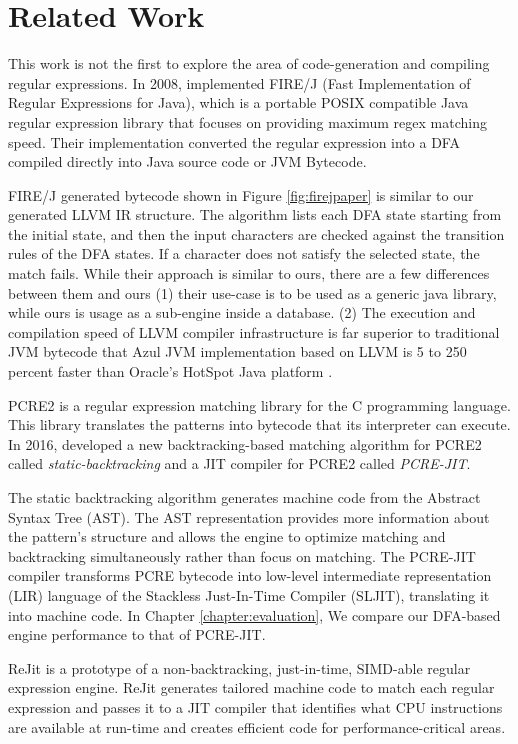 \chapter{Related Work}\label{chapter:related_work}
This work is not the first to explore the area of code-generation and compiling regular expressions. In 2008, \citet{firejpaper} implemented FIRE/J (Fast Implementation of Regular Expressions for Java), which is a portable POSIX compatible Java regular expression library that focuses on providing maximum regex matching speed. Their implementation converted the regular expression into a DFA compiled directly into Java source code or JVM Bytecode.

\noindent FIRE/J generated bytecode shown in Figure \ref{fig:firejpaper} is similar to our generated LLVM IR structure. The algorithm lists each DFA state starting from the initial state, and then the input characters are checked against the transition rules of the DFA states. If a character does not satisfy the selected state, the match fails. While their approach is similar to ours, there are a few differences between them and ours (1) their use-case is to be used as a generic java library, while ours is usage as a sub-engine inside a database. (2) The execution and compilation speed of LLVM compiler infrastructure is far superior to traditional JVM bytecode that Azul JVM implementation based on LLVM is 5 to 250 percent faster than Oracle's HotSpot Java platform \cite{azul}.

PCRE2 is a regular expression matching library for the C programming language. This library translates the patterns into bytecode that its interpreter can execute. In 2016, \citet{pcre2_jit} developed a new backtracking-based matching algorithm for PCRE2 called \textit{static-backtracking} and a JIT compiler for PCRE2 called \textit{PCRE-JIT}.

The static backtracking algorithm generates machine code from the Abstract Syntax Tree (AST). The AST representation provides more information about the pattern's structure and allows the engine to optimize matching and backtracking simultaneously rather than focus on matching. The PCRE-JIT compiler transforms PCRE bytecode into low-level intermediate representation (LIR) language of the Stackless Just-In-Time Compiler (SLJIT), translating it into machine code. In Chapter \ref{chapter:evaluation}, We compare our DFA-based engine performance to that of PCRE-JIT.

ReJit \cite{rejit} is a prototype of a non-backtracking, just-in-time, SIMD-able regular expression engine. ReJit generates tailored machine code to match each regular expression and passes it to a JIT compiler that identifies what CPU instructions are available at run-time and creates efficient code for performance-critical areas.

